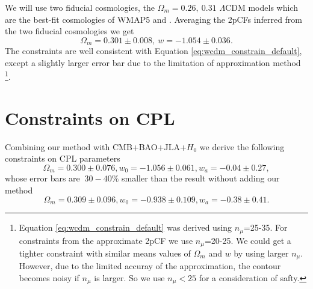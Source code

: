 \documentclass[useAMS,usenatbib]{mnras}
\begin{document}
We will use two fiducial cosmologies,
the $\Omega_m=0.26,\ 0.31$ $\Lambda$CDM models which are the best-fit cosmologies of WMAP5 \cite{WMAP5} and \cite{Planck}.
Averaging the 2pCFs inferred from the two fiducial cosmologies we get
\begin{equation}
\Omega_m = 0.301 \pm 0.008,\ w=-1.054\pm 0.036.
\end{equation}
The constraints are well consistent with Equation \ref{eq:wcdm_constrain_default},
except a slightly larger error bar due to the limitation of approximation method
\footnote{Equation \ref{eq:wcdm_constrain_default} was derived using $n_{\mu}$=25-35.
For constraints from the approximate 2pCF we use $n_{\mu}$=20-25.
We could get a tighter constraint with similar means values of $\Omega_m$ and $w$ by using larger $n_\mu$.
However, due to the limited accuray of the approximation, the contour becomes noisy if $n_\mu$ is larger.
So we use $n_\mu<25$ for a consideration of safty. }.



\section{Constraints on CPL}

Combining our method with CMB+BAO+JLA+$H_0$ we derive the following constraints on CPL parameters
\begin{equation}
\Omega_m = 0.300 \pm 0.076, w_0 = -1.056 \pm 0.061, w_a = -0.04 \pm 0.27,
\end{equation}
whose error bars are $~30-40\%$ smaller than the result without adding our method
\begin{equation}
\Omega_m = 0.309 \pm 0.096, w_0 = -0.938 \pm 0.109, w_a = -0.38 \pm 0.41.
\end{equation}
\end{document}

